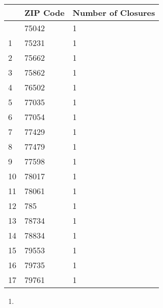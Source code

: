 \documentclass[
  letterpaper,
  DIV=11,
  numbers=noendperiod]{scrartcl}
\providecommand{\tightlist}{%
  \setlength{\itemsep}{0pt}\setlength{\parskip}{0pt}}\usepackage{longtable,booktabs,array}
\begin{document}
\begin{longtable}[]{@{}lll@{}}
\toprule\noalign{}
& ZIP Code & Number of Closures \\
\midrule\noalign{}
\endhead
\bottomrule\noalign{}
\endlastfoot
0 & 75042 & 1 \\
1 & 75231 & 1 \\
2 & 75662 & 1 \\
3 & 75862 & 1 \\
4 & 76502 & 1 \\
5 & 77035 & 1 \\
6 & 77054 & 1 \\
7 & 77429 & 1 \\
8 & 77479 & 1 \\
9 & 77598 & 1 \\
10 & 78017 & 1 \\
11 & 78061 & 1 \\
12 & 785 & 1 \\
13 & 78734 & 1 \\
14 & 78834 & 1 \\
15 & 79553 & 1 \\
16 & 79735 & 1 \\
17 & 79761 & 1 \\
\end{longtable}

\begin{enumerate}
\def\labelenumi{\arabic{enumi}.}
\setcounter{enumi}{1}
\tightlist
\item
\end{enumerate}
\end{document}
